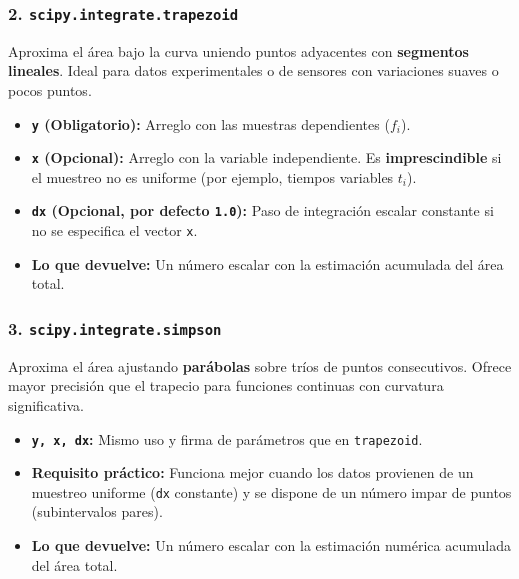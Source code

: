\documentclass[12pt]{article}
\begin{document}
\begin{cajaflex}
\subsubsection*{\textcolor{teal!70!black}{2. \texttt{scipy.integrate.trapezoid} }}
Aproxima el área bajo la curva uniendo puntos adyacentes con \textbf{segmentos lineales}. 
Ideal para datos experimentales o de sensores con variaciones 
suaves o pocos puntos.
\begin{itemize}
    \item \textbf{\texttt{y} (Obligatorio):} Arreglo con las muestras dependientes ($f_i$).
    \item \textbf{\texttt{x} (Opcional):} Arreglo con la variable independiente. Es \textbf{imprescindible} si el muestreo no es uniforme (por ejemplo, tiempos variables $t_i$).
    \item \textbf{\texttt{dx} (Opcional, por defecto \texttt{1.0}):} Paso de integración escalar constante si no se especifica el vector \texttt{x}.
    \item \textbf{Lo que devuelve:} Un número escalar con la estimación acumulada del área total.
\end{itemize}

\subsubsection*{\textcolor{teal!70!black}{3. \texttt{scipy.integrate.simpson} }}
Aproxima el área ajustando \textbf{parábolas} sobre tríos de puntos consecutivos. Ofrece mayor precisión que el trapecio para funciones continuas con curvatura significativa.
\begin{itemize}
    \item \textbf{\texttt{y, x, dx}:} Mismo uso y firma de parámetros que en \texttt{trapezoid}.
    \item \textbf{Requisito práctico:} Funciona mejor cuando los datos provienen de un muestreo uniforme (\texttt{dx} constante) y se dispone de un número impar de puntos (subintervalos pares).
    \item \textbf{Lo que devuelve:} Un número escalar con la estimación numérica acumulada del área total.
\end{itemize}


\end{cajaflex}
\end{document}
